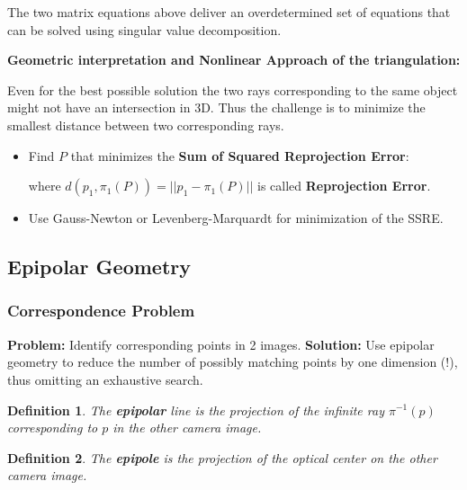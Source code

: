 \documentclass[10pt,a4paper]{scrartcl}
\newtheorem{define}{Definition}
\begin{document}
\begin{multicols*}{2}
The two matrix equations above deliver an overdetermined set of equations that can be solved using singular value decomposition.

\vspace{3ex}

\textbf{Geometric interpretation and Nonlinear Approach of the triangulation:}

\vspace{3ex}

Even for the best possible solution the two rays corresponding to the same object might not have an intersection in 3D. Thus the challenge is to minimize the smallest distance between two corresponding rays.


\begin{itemize}
\item Find $P$ that minimizes the \textbf{Sum of Squared Reprojection Error}:


where $d(p_1,\pi_1(P))=||p_1-\pi_1(P)||$ is called \textbf{Reprojection Error}.
\item Use Gauss-Newton or Levenberg-Marquardt for minimization of the SSRE.
\end{itemize}

\subsection{Epipolar Geometry}

\subsubsection{Correspondence Problem}

\textbf{Problem:} Identify corresponding points in 2 images. \textbf{Solution:} Use epipolar geometry to reduce the number of possibly matching points by one dimension (!), thus omitting an exhaustive search.

\begin{define}
The \textbf{epipolar} line is the projection of the infinite ray $\pi^{-1}(p)$ corresponding to $p$ in the other camera image.
\end{define}

\begin{define}
The \textbf{epipole} is the projection of the optical center on the other camera image.
\end{define}


\end{multicols*}
\end{document}
